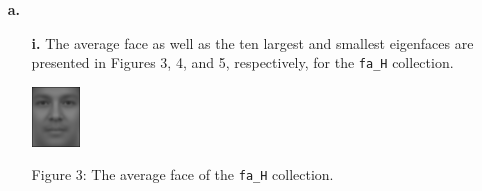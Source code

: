 \documentclass[ 12pt ]{article}
\begin{document}
\begin{enumerate}
    \item[\textbf{a.}]
        \begin{enumerate}
            \item[\textbf{i.}] The average face as well as the ten largest and smallest eigenfaces are presented in Figures 3, 4, and 5, respectively, for the \verb|fa_H| collection.
                \begin{center}
                    \includegraphics[scale=1.7]{AnyConv.com__average_face}
                \end{center}
                \begin{center}
                    \scriptsize
                    Figure 3: The average face of the \verb|fa_H| collection.
                \end{center}


\end{enumerate}
\end{enumerate}
\end{document}
